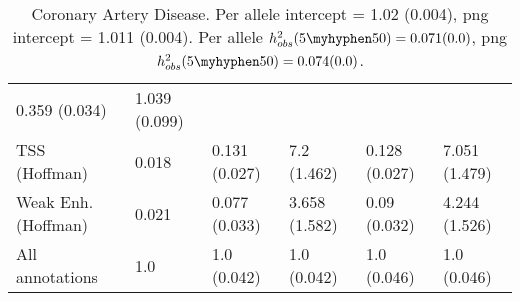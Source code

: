 \documentclass[11pt]{article}
\begin{document}
\begin{table}[H]
\begin{center}
\begin{tabular}{l|lllll}
0.359 (0.034) & 1.039 (0.099) \\
TSS (Hoffman)  &  0.018 & 0.131 (0.027) & 7.2 (1.462) &
0.128 (0.027) & 7.051 (1.479) \\
Weak Enh. (Hoffman)  &  0.021 & 0.077 (0.033) & 3.658 (1.582) &
0.09 (0.032) & 4.244 (1.526) \\
All annotations  &  1.0 & 1.0 (0.042) & 1.0 (0.042) &
1.0 (0.046) & 1.0 (0.046) \\
\end{tabular}
\caption{Coronary Artery Disease.
Per allele intercept = 1.02 (0.004),
png intercept = 1.011 (0.004).
Per allele $h^2_{obs}(5\myhyphen50) = 0.071 (0.0)$,
png $h^2_{obs}(5\myhyphen50) = 0.074 (0.0)$.}
\end{center}
\end{table}
\end{document}

